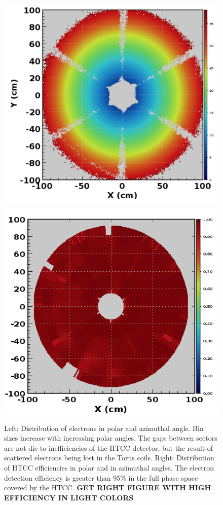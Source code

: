 \documentclass[final,3p,twocolumn]{elsarticle}
\begin{document}
\begin{figure}[htbp!]
{\includegraphics[width=1.0\columnwidth]{htcc-dis.png}}
{\includegraphics[width=1.0\columnwidth]{htcc-eff.png}}
\caption{ Left: Distribution of electrons in polar and azimuthal angle. Bin sizes increase with increasing polar angles. The 
gaps between sectors are not die to inefficiencies of the HTCC detector, but the result of scattered electrons being lost
in the Torus coils. Right: Distribution of HTCC efficiencies in polar and in azimuthal angles. The electron detection efficiency
is greater than 95\% in the full phase space covered by the HTCC. {\bf GET RIGHT FIGURE WITH HIGH EFFICIENCY
IN LIGHT COLORS}} 
\label{htcc-eff}
\end{figure}
\end{document}
